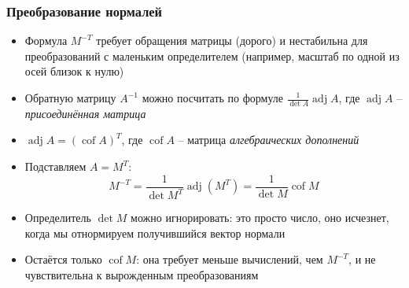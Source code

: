 \documentclass[10pt]{beamer}
\begin{document}
\begin{frame}[fragile]
\frametitle{Преобразование нормалей}
\begin{itemize}
\item Формула \begin{math}M^{-T}\end{math} требует обращения матрицы (дорого) и нестабильна для преобразований с маленьким определителем (например, масштаб по одной из осей близок к нулю)
\pause
\item Обратную матрицу \begin{math}A^{-1}\end{math} можно посчитать по формуле \begin{math}\frac{1}{\operatorname{det}A}\operatorname{adj}{A}\end{math}, где \begin{math}\operatorname{adj}{A}\end{math} -- \textit{присоединённая матрица}
\pause
\item \begin{math}\operatorname{adj}{A}=(\operatorname{cof}{A})^T\end{math}, где \begin{math}\operatorname{cof}{A}\end{math} -- матрица \textit{алгебраических дополнений}
\pause
\item Подставляем \begin{math}A=M^T\end{math}:
\begin{equation*}
M^{-T} = \frac{1}{\operatorname{det} M^T}\operatorname{adj}(M^T) = \frac{1}{\operatorname{det}M}\operatorname{cof}M
\end{equation*}
\pause
\item Определитель \begin{math}\operatorname{det}M\end{math} можно игнорировать: это просто число, оно исчезнет, когда мы отнормируем получившийся вектор нормали
\pause
\item Остаётся только \begin{math}\operatorname{cof}M\end{math}: она требует меньше вычислений, чем \begin{math}M^{-T}\end{math}, и не чувствительна к вырожденным преобразованиям
\end{itemize}
\end{frame}
\end{document}
